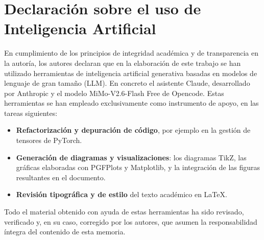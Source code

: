\section{Declaración sobre el uso de Inteligencia Artificial}\label{app:ia}

En cumplimiento de los principios de integridad académica y de transparencia en la autoría, los autores declaran que en la elaboración de este trabajo se han utilizado herramientas de inteligencia artificial generativa basadas en modelos de lenguaje de gran tamaño (LLM). En concreto el asistente Claude, desarrollado por Anthropic y el modelo MiMo-V2.6-Flash Free de Opencode. Estas herramientas se han empleado exclusivamente como instrumento de apoyo, en las tareas siguientes:

\begin{itemize}
  \item \textbf{Refactorización y depuración de código}, por ejemplo en la gestión de tensores de PyTorch.
  \item \textbf{Generación de diagramas y visualizaciones}: los diagramas TikZ, las gráficas elaboradas con PGFPlots y Matplotlib, y la integración de las figuras resultantes en el documento.
  \item \textbf{Revisión tipográfica y de estilo} del texto académico en \LaTeX{}.
\end{itemize}

Todo el material obtenido con ayuda de estas herramientas ha sido revisado, verificado y, en su caso, corregido por los autores, que asumen la responsabilidad íntegra del contenido de esta memoria.
